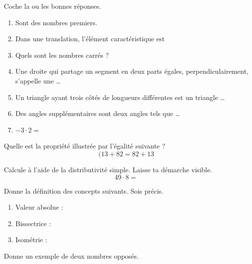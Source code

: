 \documentclass[parskip=half-,DIV=12,twoside=semi, 12pt]{scrartcl}
\newcounter{l}
\begin{document}
\begin{connaitre}[points=6]
    Coche la ou les bonnes réponses.
    \begin{enumerate}
        \item Sont des nombres premiers.
        \item Dans une translation, l'élément caractéristique est
        \item Quels sont les nombres carrés ?
        \item Une droite qui partage un segment en deux parts égales, perpendiculairement, s'appelle une \dots
        \item Un triangle ayant trois côtés de longueurs différentes est un triangle \dots
        \item Des angles supplémentaires sont deux angles tels que \dots
        \item \(-3 \cdot 2 =\)
    \end{enumerate}
\end{connaitre}
\begin{connaitre}[points=1]
    Quelle est la propriété illustrée par l'égalité suivante ?
    \[(13+82 = 82 + 13\]
\end{connaitre}
\begin{connaitre}[points=1]
    Calcule à l'aide de la distributivité simple. Laisse ta démarche visible.
    \[49 \cdot 8=\]
\end{connaitre}
\begin{connaitre}[points=3]
    Donne la définition des concepts suivants. Sois précis.
    \begin{enumerate}
        \item Valeur absolue :
        \item Bissectrice :
        \item Isométrie :
    \end{enumerate}
\end{connaitre}
\begin{connaitre}[points=1]
    Donne un exemple de deux nombres opposés.
\end{connaitre}
\end{document}
